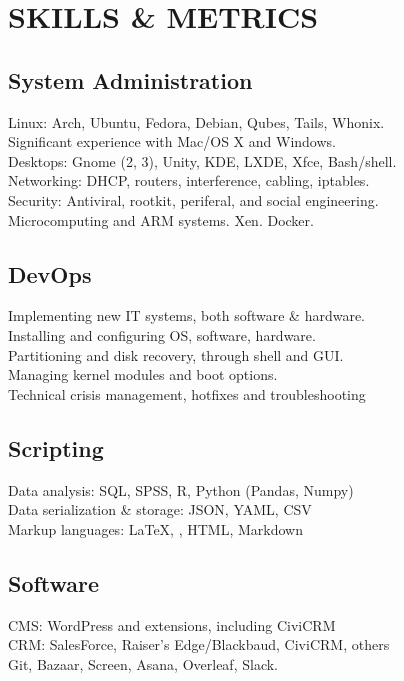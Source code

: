 \documentclass[]{deedy-resume-openfont}
\begin{document}
\section{SKILLS \& METRICS}
\begin{minipage}[t]{.5\textwidth}
    \subsection{System Administration}
		\textbullet{} Linux: Arch, Ubuntu, Fedora, Debian, Qubes, Tails, Whonix.\\
        \textbullet{} Significant experience with Mac/OS X and Windows. \\
   		\textbullet{} Desktops: Gnome (2, 3), Unity, KDE, LXDE, Xfce, Bash/shell. \\
    	\textbullet{} Networking: DHCP, routers, interference, cabling, iptables.\\
		\textbullet{} Security: Antiviral, rootkit, periferal, and social engineering.\\
        \textbullet{} Microcomputing and ARM systems. Xen. Docker.
    \sectionsep
	\subsection{DevOps}
   		\textbullet{} Implementing new IT systems, both software \& hardware.\\
       	\textbullet{} Installing and configuring OS, software, hardware. \\
        \textbullet{} Partitioning and disk recovery, through shell and GUI. \\
        \textbullet{} Managing kernel modules and boot options.\\
        \textbullet{} Technical crisis management, hotfixes and troubleshooting
    \sectionsep
   	\subsection{Scripting}
        \textbullet{} Data analysis: SQL, SPSS, R, Python (Pandas, Numpy) \\
        \textbullet{} Data serialization \& storage: JSON, YAML, CSV \\
        \textbullet{} Markup languages: \LaTeX, \XeLaTeX, HTML, Markdown 
    \sectionsep
    \subsection{Software}
        \textbullet{} CMS: WordPress and extensions, including CiviCRM \\
        \textbullet{} CRM: SalesForce, Raiser's Edge/Blackbaud, CiviCRM, others\\
        \textbullet{} Git, Bazaar, Screen, Asana, Overleaf, Slack.
\end{minipage}
\end{document}
